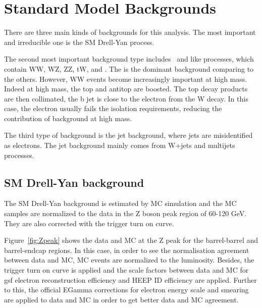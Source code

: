 \clearpage
\section{Standard Model Backgrounds}\label{ZP_SM_background}
There are three main kinds of backgrounds for this analysis. The most important and irreducible one is the SM Drell-Yan process.

The second most important background type includes \ttbar\ and \ttbar\-like processes, which contain WW, WZ, ZZ, tW, and \ztt. The \ttbar is the dominant background comparing to the others. However, WW events become increasingly important at high mass. Indeed at high mass, the top and antitop are boosted. The top decay products are then collimated, the b jet is close to the electron from the W decay. In this case, the electron usually fails the isolation requirements, reducing the contribution of \ttbar background at high mass.

The third type of background is the jet background, where jets are misidentified as electrons. The jet background mainly comes from W+jets and multijets processes.

\subsection{SM Drell-Yan background}\label{sbusec:DY_xs}

The SM Drell-Yan background is estimated by MC simulation and the MC samples are normalized to the data in the Z boson peak region of 60-120 GeV. They are also corrected with the trigger turn on curve.

Figure~\ref{fig:Zpeak} shows the data and MC at the Z peak for the barrel-barrel and barrel-endcap regions. In this case, in order to see the normalisation agreement between data and MC, MC events are normalized to the luminosity. Besides, the trigger turn on curve is applied and the scale factors between data and MC for gsf electron reconstruction efficiency and HEEP ID efficiency are applied. Further to this, the official EGamma corrections for electron energy scale and smearing are applied to data and MC in order to get better data and MC agreement.


